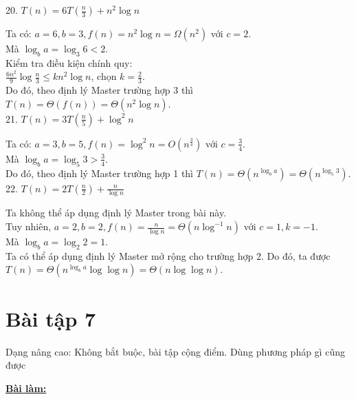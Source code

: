 \documentclass[12pt, a4paper, fleqn]{article}
\begin{document}
		20. $\displaystyle
		T(n) = 6T\left( \frac{n}{3} \right) + n^2 \log n$
		
		Ta có: $a = 6, b = 3, f(n) = n^2 \log n = \Omega (n^2)$ với $c = 2$.\\
		Mà $\log_{b} a = \log_{3} 6 < 2$.\\
		Kiểm tra điều kiện chính quy:\\
		$\displaystyle
		\frac{6n^2}{9} \log \frac{n}{3} \leq kn^2 \log n$, chọn $\displaystyle
		k = \frac{2}{3}$.\\
		Do đó, theo định lý Master trường hợp 3 thì $T(n) = \Theta (f(n)) = \Theta (n^2 \log n)$.
		\\
		
		21. $\displaystyle
		T(n) = 3T\left( \frac{n}{5} \right) + \log^{2}{n}$
		
		Ta có: $\displaystyle
		a = 3, b = 5, f(n) = \log^{2}{n} = O \left( n^\frac{3}{4} \right)$ với $\displaystyle
		c = \frac{3}{4}$.\\
		Mà $\displaystyle
		\log_{b} a = \log_{5} 3 > \frac{3}{4}$.\\
		Do đó, theo định lý Master trường hợp 1 thì $T(n) = \Theta \left( n^{\log_{b} a} \right) = \Theta (n^{\log_{5} 3})$.
		\\
		
		22. $\displaystyle
		T(n) = 2T\left( \frac{n}{2} \right) + \frac{n}{\log n}$
		
		Ta không thể áp dụng định lý Master trong bài này.\\
		Tuy nhiên,  $\displaystyle
		a = 2, b = 2, f(n) = \frac{n}{\log n} = \Theta \left( n \log^{-1} n \right)$ với $c = 1, k = -1$.\\
		Mà $\displaystyle
		\log_{b} a = \log_{2} 2 = 1$.\\
		Ta có thể áp dụng định lý Master mở rộng cho trường hợp 2. Do đó, ta được $T(n) = \Theta \left( n^{\log_{b} a} \log{\log n} \right) = \Theta (n \log{\log n})$.
	
	
	\clearpage

	\section*{Bài tập 7}
		Dạng nâng cao: Không bắt buộc, bài tập cộng điểm. Dùng phương pháp gì cũng được
		
		\begin{center}
			\textbf{\underline{Bài làm:}}
		\end{center}
	
\end{document}
